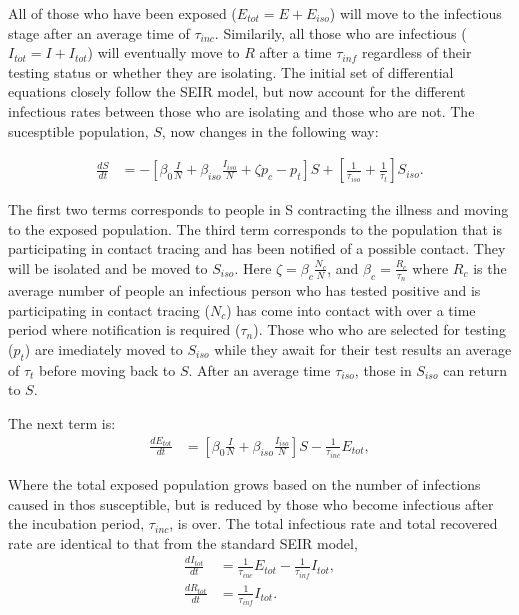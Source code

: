 \documentclass[notitlepage, superscriptaddress]{revtex4-2}
\begin{document}
All of those who have been exposed ($E_{tot} = E + E_{iso}$) will move to the infectious stage after an average time of $\tau_{inc}$. Similarily, all those who are infectious ($I_{tot} =  I + I_{tot}$) will eventually move to $R$ after a time $\tau_{inf}$ regardless of their testing status or whether they are isolating. The initial set of differential equations closely follow the SEIR model, but now account for the different infectious rates between those who are isolating and those who are not. The sucesptible population, $S$, now changes in the following way:

\begin{eqnarray}
\label{E:ds}
\frac{dS}{dt} &= - [\beta_0 \frac{I}{N} + \beta_{iso} \frac{I_{iso}}{N} + \zeta p_{c} - p_{t}] S + [\frac{1}{\tau_{iso}} + \frac{1}{\tau_t}] S_{iso}.
\end{eqnarray}

The first two terms corresponds to people in S contracting the illness and moving to the exposed population. The third term corresponds to the population that is participating in contact tracing and has been notified of a possible contact. They will be isolated and be moved to $S_{iso}$. Here $\zeta = \beta_{c}\frac{N_{c}}{N}$, and $\beta_c = \frac{R_c}{\tau_n}$ where $R_c$ is the average number of people an infectious person who has tested positive and is participating in contact tracing ($N_c$) has come into contact with over a time period where notification is required ($\tau_n$). Those who who are selected for testing ($p_t$) are imediately moved to $S_{iso}$ while they await for their test results an average of $\tau_t$ before moving back to $S$. After an average time $\tau_{iso}$, those in $S_{iso}$ can return to $S$.

The next term is:
\begin{eqnarray}
\label{E:dEtot}
\frac{dE_{tot}}{dt} &= [\beta_0 \frac{I}{N} + \beta_{iso} \frac{I_{iso}}{N}] S - \frac{1}{\tau_{inc}}E_{tot}, 
\end{eqnarray}

Where the total exposed population grows based on the number of infections caused in thos susceptible, but is reduced by those who become infectious after the incubation period, $\tau_{inc}$, is over. The total infectious rate and total recovered rate are identical to that from the standard SEIR model,
\begin{eqnarray}
\label{E:dItot}
\frac{dI_{tot}}{dt} &= \frac{1}{\tau_{inc}}E_{tot} - \frac{1}{\tau_{inf}}I_{tot}, \\
\frac{dR_{tot}}{dt} &= \frac{1}{\tau_{inf}}I_{tot}.
\end{eqnarray}
\end{document}
